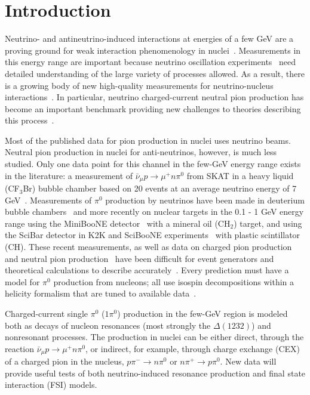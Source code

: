 
\section{Introduction}

Neutrino- and antineutrino-induced interactions at energies of
a few GeV are a proving ground for weak interaction
phenomenology in nuclei~\cite{Alvarez-Ruso:2014bla}.
Measurements in this energy range are important because 
neutrino oscillation experiments~\cite{Ayres:2004js,LBNE} need 
detailed understanding of the large variety of processes allowed.  
As a result, there is a growing body of new high-quality measurements for 
neutrino-nucleus
interactions~\cite{AguilarArevalo:2007ab,Lyubushkin:2008pe,nubarprl,miniboone_piprod}. 
In particular, neutrino charged-current neutral pion 
production has become an important benchmark providing new challenges 
to theories describing this process~\cite{gibuu-pi,valencia-pi,Rodrigues:2014jfa,Yu:2014yja}.

Most of the published data for pion production in nuclei uses 
neutrino beams.  Neutral pion production in nuclei for anti-neutrinos,
however, is much less studied.
Only one data point for this channel in the few-GeV energy range exists 
in the literature: 
a measurement of $\bar{\nu}_\mu p \rightarrow \mu^+ n \pi^0$
from SKAT in a heavy liquid (CF$_3$Br) bubble chamber based on 20 events
at an average neutrino energy of 7 GeV~\cite{Grabosch89}. 
Measurements of $\pi^0$ production by neutrinos have been made in 
deuterium bubble chambers~\cite{Allasia90, Barish79, Radecky82, Kitagaki86}
 and more recently on nuclear targets in the 0.1 - 1 GeV energy range
using 
the MiniBooNE detector~\cite{AguilarArevalo:2008qa} with a mineral oil (CH$_2$) target, and
using the SciBar detector in K2K and SciBooNE 
experiments~\cite{Mariani:2007,Kurimoto:2009} with plastic scintillator (CH).
These recent measurements, as well as data on charged pion 
production~\cite{miniboone_piprod,Eberly:2014mra} and 
neutral pion production~\cite{Augil11} have been difficult 
for event generators and theoretical calculations to 
describe accurately~\cite{gibuu-pi,valencia-pi,Rodrigues:2014jfa,Yu:2014yja}.
Every prediction must have a model for $\pi^0$ production from
nucleons; all use isospin decompositions within
a helicity formalism that are tuned to available data~\cite{Rein:1980wg}.

Charged-current single $\pi^0$ ($1\pi^0$) production in the few-GeV region
is modeled both as decays of nucleon resonances (most strongly
the $\Delta(1232)$) and nonresonant processes. The production 
in nuclei can be
either direct, through the reaction $\bar{\nu}_\mu p \rightarrow \mu^{+} n
\pi^0$, or indirect, for example, through charge exchange (CEX) of a charged pion in the nucleus, 
$p\pi^-\rightarrow n\pi^0$ or $n\pi^+\rightarrow p\pi^0$.
New data will provide useful tests  
of both neutrino-induced resonance production and final state 
interaction (FSI) models. 


